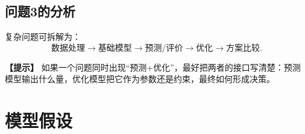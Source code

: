 \documentclass[12pt,a4paper]{article}
\newcommand{\tip}[1]{\par\noindent\textbf{【提示】} #1\par}
\begin{document}
\subsection{问题3的分析}

复杂问题可拆解为：
\[
\text{数据处理}\rightarrow\text{基础模型}\rightarrow\text{预测/评价}\rightarrow\text{优化}\rightarrow\text{方案比较}. 
\]

\tip{如果一个问题同时出现“预测+优化”，最好把两者的接口写清楚：预测模型输出什么量，优化模型把它作为参数还是约束，最终如何形成决策。}

\section{模型假设}
\end{document}
